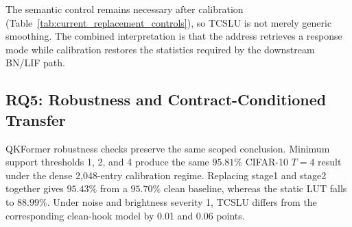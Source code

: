 \begin{table}[t]
\centering
\footnotesize
{}
\caption{TCSLU component study (Acc@1, \%). The result supports dynamic
current calibration, not a claim that each named component produces an
independent monotonic gain.}
\label{tab:tcslu_ablation}
\end{table}

The semantic control remains necessary after calibration
(Table~\ref{tab:current_replacement_controls}), so TCSLU is not merely generic
smoothing. The combined interpretation is that the address retrieves a
response mode while calibration restores the statistics required by the
downstream BN/LIF path.

\subsection{RQ5: Robustness and Contract-Conditioned Transfer}
\label{sec:robustness_transfer}

QKFormer robustness checks preserve the same scoped conclusion. Minimum
support thresholds 1, 2, and 4 produce the same $95.81\%$ CIFAR-10 $T=4$
result under the dense 2,048-entry calibration regime. Replacing stage1 and
stage2 together gives $95.43\%$ from a $95.70\%$ clean baseline, whereas the
static LUT falls to $88.99\%$. Under noise and brightness severity 1, TCSLU
differs from the corresponding clean-hook model by 0.01 and 0.06 points.

